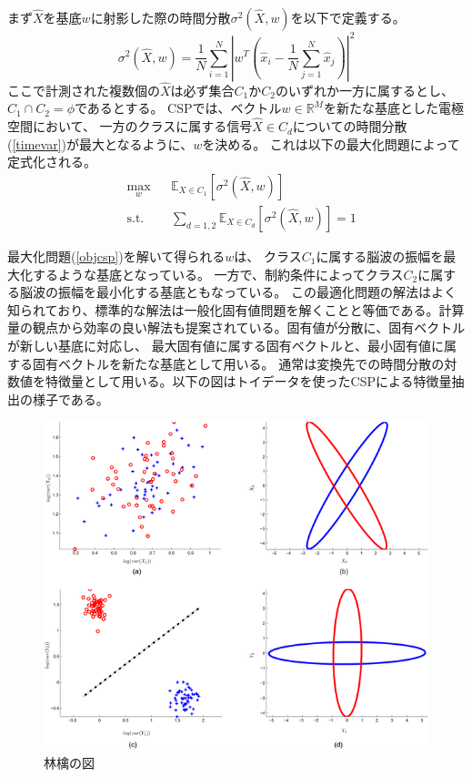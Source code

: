 まず\(\hat X\)を基底\(w\)に射影した際の時間分散\(\sigma^2 (\hat X, w)\)を以下で定義する。
\begin{equation}
    \sigma^2 (\hat X, w)  = \frac{1}{N}\sum_{i=1}^N \left|w^T \left(\hat x_i - \frac{1}{N} \sum_{j=1}^N \hat x_j \right) \right|^2
    \label{timevar}
\end{equation}
ここで計測された複数個の\(\hat X\)は必ず集合\(C_1\)か\(C_2\)のいずれか一方に属するとし、
\(C_1 \cap C_2 = \phi \)であるとする。
CSPでは、ベクトル\(w \in \mathbb {R}^M\)を新たな基底とした電極空間において、
一方のクラスに属する信号\(\hat X \in {C_d}\)についての時間分散(\ref{timevar})が最大となるように、\(w\)を決める。
これは以下の最大化問題によって定式化される。
\begin{equation}
    \begin{aligned}
    & \max_w
    & & \mathbb E_{X \in C_1} \left[\sigma^2 (\hat X, w) \right] \\
    & \text{s.t.}
    & &  \sum_{d=1,2} \mathbb E_{X \in C_d} \left[\sigma^2 (\hat X, w) \right] = 1
    \end{aligned}
    \label{objcsp}
\end{equation}

最大化問題(\ref{objcsp})を解いて得られる\(w\)は、
クラス\(C_1\)に属する脳波の振幅を最大化するような基底となっている。
一方で、制約条件によってクラス\(C_2\)に属する脳波の振幅を最小化する基底ともなっている。
この最適化問題の解法はよく知られており、標準的な解法は一般化固有値問題を解くことと等価である。計算量の観点から効率の良い解法も提案されている。固有値が分散に、固有ベクトルが新しい基底に対応し、
最大固有値に属する固有ベクトルと、最小固有値に属する固有ベクトルを新たな基底として用いる。
通常は変換先での時間分散の対数値を特徴量として用いる。以下の図はトイデータを使ったCSPによる特徴量抽出の様子である。

\begin{figure}
    \centering
    \includegraphics[width=12cm]{images/apple.png}
    \caption{林檎の図}
\end{figure}
  

